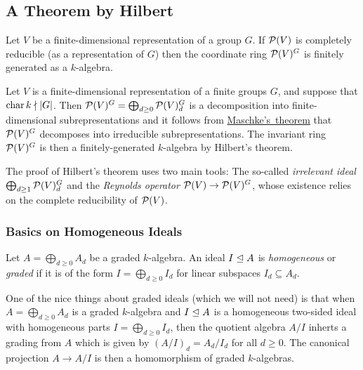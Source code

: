 \subsection{A Theorem by Hilbert}


\begin{theorem}[Hilbert]
  Let $V$ be a finite-dimensional representation of a group $G$.
  If $\mathcal{P}(V)$ is completely reducible (as a representation of $G$) then the coordinate ring $\mathcal{P}(V)^G$ is finitely generated as a $k$-algebra.
\end{theorem}


\begin{example}
  \label{example: invariant ring for finite groups finitely generated}
  Let $V$ is a finite-dimensional representation of a finite groups $G$, and suppose that $\operatorname{char}{k} \nmid |G|$.
  Then $\mathcal{P}(V)^G = \bigoplus_{d \geq 0} \mathcal{P}(V)^G_d$ is a decomposition into finite-dimensional subrepresentations and it follows from \hyperref[theorem: maschkes theorem]{Maschke’s~theorem} that $\mathcal{P}(V)^G$ decomposes into irreducible subrepresentations.
  The invariant ring $\mathcal{P}(V)^G$ is then a finitely-generated $k$-algebra by Hilbert’s theorem.
\end{example}


\begin{fluff}
  The proof of Hilbert's theorem uses two main tools:
  The so-called \emph{irrelevant ideal} $\bigoplus_{d \geq 1} \mathcal{P}(V)^G_d$ and the \emph{Reynolds operator} $\mathcal{P}(V) \to \mathcal{P}(V)^G$, whose existence relies on the complete reducibility of $\mathcal{P}(V)$.
\end{fluff}



\subsubsection{Basics on Homogeneous Ideals}


\begin{definition}
  Let $A = \bigoplus_{d \geq 0} A_d$ be a graded $k$-algebra.
  An ideal $I \trianglelefteq A$ is \emph{homogeneous} or \emph{graded} if it is of the form $I = \bigoplus_{d \geq 0} I_d$ for linear subspaces $I_d \subseteq A_d$.
\end{definition}


\begin{remark}
  \label{remark: quotient by homogeneous ideals are again graded}
  One of the nice things about graded ideals (which we will not need) is that when $A = \bigoplus_{d \geq 0} A_d$ is a graded $k$-algebra and $I \trianglelefteq A$ is a homogeneous two-sided ideal with homogeneous parts $I = \bigoplus_{d \geq 0} I_d$, then the quotient algebra $A/I$ inherts a grading from $A$ which is given by $(A/I)_d = A_d/I_d$ for all $d \geq 0$.
  The canonical projection $A \to A/I$ is then a homomorphism of graded $k$-algebras.
\end{remark}


